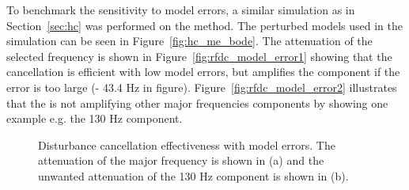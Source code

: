 To benchmark the sensitivity to model errors, a similar simulation as in Section~\ref{sec:hc} was performed on the \abbrRFDC method. The perturbed models used in the simulation can be seen in Figure~\ref{fig:hc_me_bode}. The attenuation of the selected frequency is shown in Figure~\ref{fig:rfdc_model_error1} showing that the cancellation is efficient with low model errors, but amplifies the component if the error is too large (\abbrRFDC - 43.4 Hz in figure). Figure~\ref{fig:rfdc_model_error2} illustrates that the \abbrRFDC is not amplifying other major frequencies components by showing one example e.g. the 130 Hz component.

\begin{figure}[h!]
  \centering %
  \qquad
  \caption{\label{fig:rfdc_model_error} Disturbance cancellation effectiveness with model errors. The attenuation of the major frequency is shown in (a) and the unwanted attenuation of the 130 Hz component is shown in (b).}
\end{figure}


